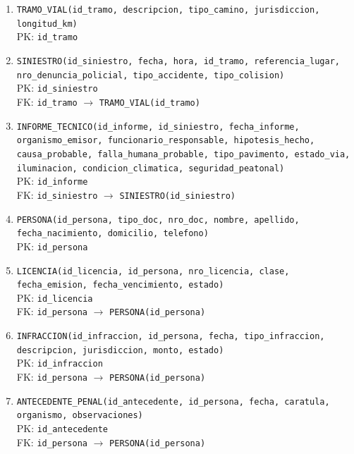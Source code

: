 \documentclass[12pt,a4paper]{article}
\begin{document}
\begin{enumerate}[leftmargin=*]
    \item \texttt{TRAMO\_VIAL(id\_tramo, descripcion, tipo\_camino, jurisdiccion, longitud\_km)}\\
    PK: \texttt{id\_tramo}

    \item \texttt{SINIESTRO(id\_siniestro, fecha, hora, id\_tramo, referencia\_lugar, nro\_denuncia\_policial, tipo\_accidente, tipo\_colision)}\\
    PK: \texttt{id\_siniestro}\\
    FK: \texttt{id\_tramo} $\rightarrow$ \texttt{TRAMO\_VIAL(id\_tramo)}

    \item \texttt{INFORME\_TECNICO(id\_informe, id\_siniestro, fecha\_informe, organismo\_emisor, funcionario\_responsable, hipotesis\_hecho, causa\_probable, falla\_humana\_probable, tipo\_pavimento, estado\_via, iluminacion, condicion\_climatica, seguridad\_peatonal)}\\
    PK: \texttt{id\_informe}\\
    FK: \texttt{id\_siniestro} $\rightarrow$ \texttt{SINIESTRO(id\_siniestro)}

    \item \texttt{PERSONA(id\_persona, tipo\_doc, nro\_doc, nombre, apellido, fecha\_nacimiento, domicilio, telefono)}\\
    PK: \texttt{id\_persona}

    \item \texttt{LICENCIA(id\_licencia, id\_persona, nro\_licencia, clase, fecha\_emision, fecha\_vencimiento, estado)}\\
    PK: \texttt{id\_licencia}\\
    FK: \texttt{id\_persona} $\rightarrow$ \texttt{PERSONA(id\_persona)}

    \item \texttt{INFRACCION(id\_infraccion, id\_persona, fecha, tipo\_infraccion, descripcion, jurisdiccion, monto, estado)}\\
    PK: \texttt{id\_infraccion}\\
    FK: \texttt{id\_persona} $\rightarrow$ \texttt{PERSONA(id\_persona)}

    \item \texttt{ANTECEDENTE\_PENAL(id\_antecedente, id\_persona, fecha, caratula, organismo, observaciones)}\\
    PK: \texttt{id\_antecedente}\\
    FK: \texttt{id\_persona} $\rightarrow$ \texttt{PERSONA(id\_persona)}


\end{enumerate}
\end{document}
